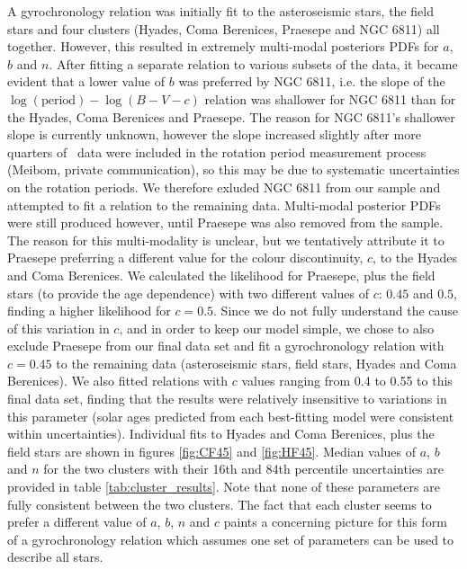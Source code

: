 A gyrochronology relation was initially fit to the asteroseismic stars, the
field stars and four clusters (Hyades, Coma Berenices, Praesepe and NGC 6811)
all together.
However, this resulted in extremely multi-modal posteriors PDFs for
$a$, $b$ and $n$.
After fitting a separate relation to various subsets of the data, it became
evident that a lower value of $b$ was preferred by NGC 6811,
i.e. the slope of the $\log(\mathrm{period})-\log(B-V-c)$ relation was
shallower for NGC 6811 than for the Hyades, Coma Berenices and Praesepe.
The reason for NGC 6811's shallower slope is currently unknown, however the
slope increased slightly after more quarters of \kepler\ data were included
in the rotation period measurement process (Meibom, private communication), so
this may be due to systematic uncertainties on the rotation periods.
We therefore exluded NGC 6811 from our sample and attempted to fit
a relation to the remaining data.
Multi-modal posterior PDFs were still produced however, until Praesepe was
also removed from the sample.
The reason for this multi-modality is unclear, but we tentatively attribute
it to Praesepe preferring a different value for the colour discontinuity, $c$,
to the Hyades and Coma Berenices.  %
We calculated the likelihood for Praesepe, plus the field stars (to provide
the age dependence) with two different values of $c$: $0.45$ and $0.5$,
finding a higher likelihood for $c=0.5$.
Since we do not fully understand the cause of this variation in $c$, and in
order to keep our model simple, we chose to also exclude Praesepe from
our final data set and fit a gyrochronology relation with $c=0.45$ to the
remaining data (asteroseismic stars, field stars, Hyades and Coma Berenices).
We also fitted relations with $c$ values ranging from 0.4 to 0.55 to this final
data set, finding that the results were relatively insensitive to variations
in this parameter (solar ages predicted from each best-fitting model were
consistent within uncertainties).
Individual fits to Hyades and Coma Berenices, plus the field stars are shown
in figures \ref{fig:CF45} and \ref{fig:HF45}.
Median values of $a$, $b$ and $n$ for the two clusters with their 16th and 84th
percentile uncertainties are provided in table
\ref{tab:cluster_results}.
Note that none of these parameters are fully consistent between the two
clusters.
The fact that each cluster seems to prefer a different value of $a$, $b$, $n$
and $c$ paints a concerning picture for this form of a gyrochronology relation
which assumes one set of parameters can be used to describe all stars.
